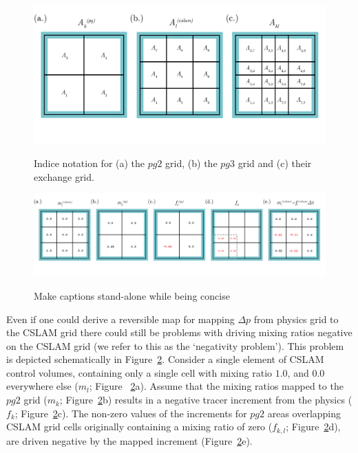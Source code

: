 \begin{figure}[t]
\begin{center}
\noindent\includegraphics[width=30pc,angle=0]{figs/area-schematic.png}\\
\end{center}
\caption{Indice notation for (a) the $pg2$ grid, (b) the $pg3$ grid and (c) their exchange grid.}
\label{fig:area-schematic}
\end{figure}

\begin{figure}[t]
\begin{center}
\noindent\includegraphics[width=30pc,angle=0]{figs/alg-schematic.png}\\
\end{center}
\caption{Make captions stand-alone while being concise}
\label{fig:alg-schematic}
\end{figure}

Even if one could derive a reversible map for mapping $\Delta p$ from physics grid to the CSLAM grid there could still be problems with driving mixing ratios negative on the CSLAM grid (we refer to this as the `negativity problem'). This problem is depicted schematically in Figure~\ref{fig:alg-schematic}. Consider a single element of CSLAM control volumes, containing only a single cell with mixing ratio $1.0$, and $0.0$ everywhere else ($m_l$; Figure ~\ref{fig:alg-schematic}a). Assume that the mixing ratios mapped to the $pg2$ grid ($m_k$; Figure~\ref{fig:alg-schematic}b) results in a negative tracer increment from the physics ($f_k$; Figure~\ref{fig:alg-schematic}c). The non-zero values of the increments for $pg2$ areas overlapping CSLAM grid cells originally containing a mixing ratio of zero ($f_{k,l}$; Figure~\ref{fig:alg-schematic}d), are driven negative by the mapped increment (Figure~\ref{fig:alg-schematic}e). 

